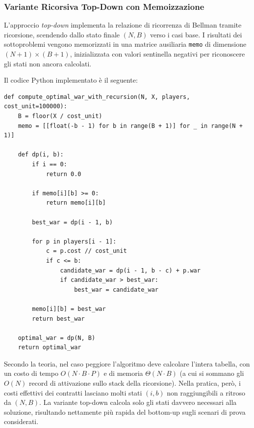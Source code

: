 \subsubsection{Variante Ricorsiva Top-Down con Memoizzazione}
L'approccio \textit{top-down} implementa la relazione di ricorrenza di Bellman tramite ricorsione, scendendo dallo stato finale $(N, B)$ verso i casi base. I risultati dei sottoproblemi vengono memorizzati in una matrice ausiliaria \texttt{memo} di dimensione $(N + 1) \times (B + 1)$, inizializzata con valori sentinella negativi per riconoscere gli stati non ancora calcolati.

Il codice Python implementato è il seguente:

\begin{lstlisting}
def compute_optimal_war_with_recursion(N, X, players, cost_unit=100000):
    B = floor(X / cost_unit)
    memo = [[float(-b - 1) for b in range(B + 1)] for _ in range(N + 1)]

    def dp(i, b):
        if i == 0:
            return 0.0

        if memo[i][b] >= 0:
            return memo[i][b]

        best_war = dp(i - 1, b)

        for p in players[i - 1]:
            c = p.cost // cost_unit
            if c <= b:
                candidate_war = dp(i - 1, b - c) + p.war
                if candidate_war > best_war:
                    best_war = candidate_war

        memo[i][b] = best_war
        return best_war

    optimal_war = dp(N, B)
    return optimal_war
\end{lstlisting}

Secondo la teoria, nel caso peggiore l'algoritmo deve calcolare l'intera tabella, con un costo di tempo $O(N \cdot B \cdot P)$ e di memoria $\Theta(N \cdot B)$ (a cui si sommano gli $O(N)$ record di attivazione sullo stack della ricorsione). Nella pratica, però, i costi effettivi dei contratti lasciano molti stati $(i, b)$ non raggiungibili a ritroso da $(N, B)$. La variante top-down calcola solo gli stati davvero necessari alla soluzione, risultando nettamente più rapida del bottom-up sugli scenari di prova considerati.

